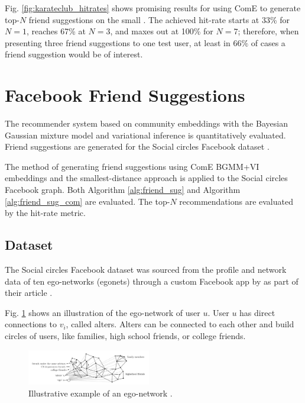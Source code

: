 \documentclass[conference]{IEEEtran}
\begin{document}
Fig. \ref{fig:karateclub_hitrates} shows promising results for using ComE to generate top-$N$ friend suggestions on the small . The achieved hit-rate starts at 33\% for $N=1$, reaches 67\% at $N=3$, and maxes out at 100\% for $N=7$; therefore, when presenting three friend suggestions to one test user, at least in $66\%$ of cases a friend suggestion would be of interest.


\section{Facebook Friend Suggestions}

The recommender system based on community embeddings with the Bayesian Gaussian mixture model and variational inference is quantitatively evaluated. Friend suggestions are generated for the Social circles Facebook dataset \cite{social_circles_fb, social_circles_in_ego_networks}.

The method of generating friend suggestions using ComE BGMM+VI embeddings and the smallest-distance approach is applied to the Social circles Facebook graph. Both Algorithm \ref{alg:friend_sug} and Algorithm \ref{alg:friend_sug_com} are evaluated. The top-$N$ recommendations are evaluated by the hit-rate metric.

\subsection{Dataset}

The Social circles Facebook dataset was sourced from the profile and network data of ten ego-networks (egonets) through a custom Facebook app by \citeauthor{social_circles_in_ego_networks} as part of their \citeyear{social_circles_in_ego_networks} article .\cite{social_circles_in_ego_networks}

Fig. \ref{fig:egonet} shows an illustration of the ego-network of user $u$. User $u$ has direct connections to $v_i$, called alters. Alters can be connected to each other and build circles of users, like families, high school friends, or college friends.

\begin{figure}[htbp]
    \centering
    \includegraphics[width=0.48\textwidth]{images/fb/egonet.png}
    \caption{Illustrative example of an ego-network \cite{social_circles_in_ego_networks}.}
    \label{fig:egonet}
\end{figure}
\end{document}
